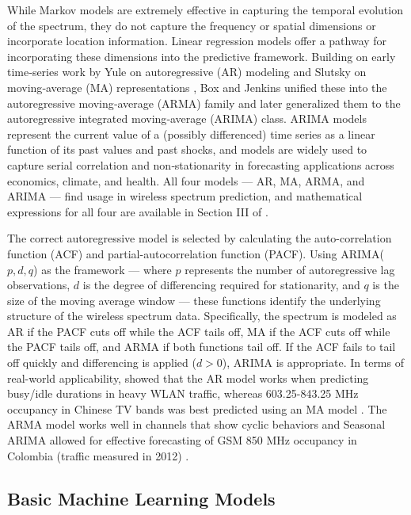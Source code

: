 \documentclass[lettersize,journal]{IEEEtran}
\begin{document}
While Markov models are extremely effective in capturing the temporal evolution of the spectrum, they do not capture the frequency or spatial dimensions or incorporate location information. Linear regression models offer a pathway for incorporating these dimensions into the predictive framework. Building on early time‑series work by Yule on autoregressive (AR) modeling \cite{Yule_1927} and Slutsky on moving‑average (MA) representations \cite{Slutzky1937Summation}, Box and Jenkins \cite{Box_1978} unified these into the autoregressive moving‑average (ARMA) family and later generalized them to the autoregressive integrated moving‑average (ARIMA) class. ARIMA models represent the current value of a (possibly differenced) time series as a linear function of its past values and past shocks, and models are widely used to capture serial correlation and non‑stationarity in forecasting applications across economics, climate, and health. All four models — AR, MA, ARMA, and ARIMA — find usage in wireless spectrum prediction, and mathematical expressions for all four are available in Section III of \cite{Ding_2017}.

The correct autoregressive model is selected by calculating the auto-correlation function (ACF) and partial-autocorrelation function (PACF). Using ARIMA($p, d, q$) as the framework — where $p$ represents the number of autoregressive lag observations, $d$ is the degree of differencing required for stationarity, and $q$ is the size of the moving average window — these functions identify the underlying structure of the wireless spectrum data. Specifically, the spectrum is modeled as AR if the PACF cuts off while the ACF tails off, MA if the ACF cuts off while the PACF tails off, and ARMA if both functions tail off. If the ACF fails to tail off quickly and differencing is applied ($d>0$), ARIMA is appropriate. In terms of real-world applicability, \cite{Hou_2021} showed that the AR model works when predicting busy/idle durations in heavy WLAN traffic, whereas 603.25-843.25 MHz occupancy in Chinese TV bands was best predicted using an MA model \cite{Su_2009}. The ARMA model works well in channels that show cyclic behaviors \cite{Tabassam_2011} and Seasonal ARIMA allowed for effective forecasting of GSM 850 MHz occupancy in Colombia (traffic measured in 2012) \cite{Pedraza_2016}.  

\subsection{Basic Machine Learning Models}
\end{document}
